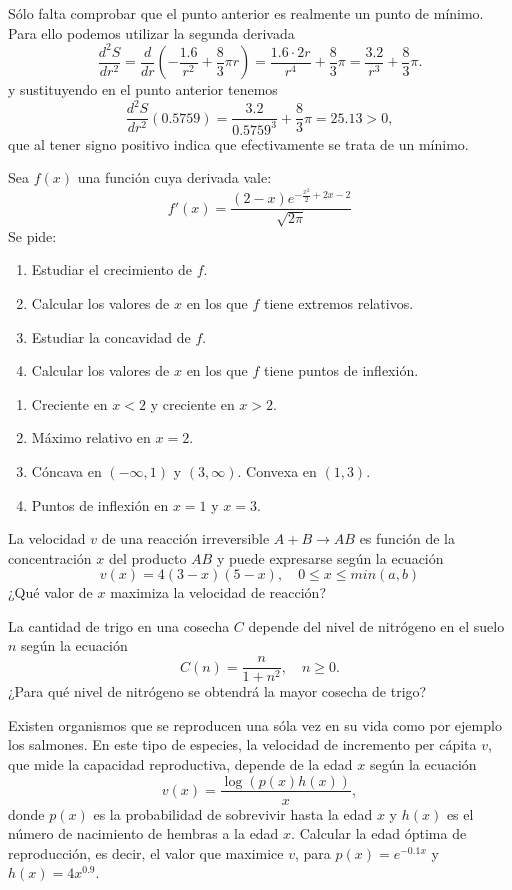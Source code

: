 {Sólo falta comprobar que el punto anterior es realmente un punto de mínimo. Para ello podemos utilizar la segunda derivada
\[
\frac{d^2S}{dr^2} = \frac{d}{dr}\left(-\frac{1.6}{r^2}+\frac{8}{3}\pi r\right) = \frac{1.6\cdot 2r}{r^4}+\frac{8}{3}\pi = \frac{3.2}{r^3}+\frac{8}{3}\pi. 
\]
y sustituyendo en el punto anterior tenemos
\[
\frac{d^2S}{dr^2}(0.5759) =  \frac{3.2}{0.5759^3}+\frac{8}{3}\pi = 25.13 >0,
\]
que al tener signo positivo indica que efectivamente se trata de un mínimo.
}

{Sea $f(x)$ una función cuya derivada vale:
\[
f'(x) = \frac{(2-x) e^{-\frac{x^2}{2}+2x-2}}{\sqrt{2\pi}}
\]
Se pide:
\begin{enumerate}
\item Estudiar el crecimiento de $f$.
\item Calcular los valores de $x$ en los que $f$ tiene extremos relativos.
\item Estudiar la concavidad de $f$.
\item Calcular los valores de $x$ en los que $f$ tiene puntos de inflexión.
\end{enumerate}
}
{\begin{enumerate}
\item Creciente en $x<2$ y creciente en $x>2$.
\item Máximo relativo en $x=2$.
\item Cóncava en $(-\infty,1)$ y $(3,\infty)$. Convexa en $(1,3)$.
\item Puntos de inflexión en $x=1$ y $x=3$.
\end{enumerate}
}
{
}


{La velocidad $v$ de una reacción irreversible $A+B\rightarrow AB$ es función de la concentración $x$ del producto $AB$ y puede expresarse según la ecuación
\[
v(x) = 4(3-x)(5-x),\quad 0\leq x\leq min(a,b)
\]
¿Qué valor de $x$ maximiza la velocidad de reacción?
}
{
}
{
}


{La cantidad de trigo en una cosecha $C$ depende del nivel de nitrógeno en el suelo $n$ según la ecuación
\[
C(n) = \frac{n}{1+n^2},\quad n\geq 0. 
\]
¿Para qué nivel de nitrógeno se obtendrá la mayor cosecha de trigo?
}
{
}
{
}


{Existen organismos que se reproducen una sóla vez en su vida como por ejemplo los salmones. 
En este tipo de especies, la velocidad de incremento per cápita $v$, que mide la capacidad reproductiva, depende de la edad $x$ según la ecuación
\[
v(x) = \frac{\log(p(x)h(x))}{x},
\] 
donde $p(x)$ es la probabilidad de sobrevivir hasta la edad $x$ y $h(x)$ es el número de nacimiento de hembras a la edad $x$. 
Calcular la edad óptima de reproducción, es decir, el valor que maximice $v$, para $p(x)=e^{-0.1x}$ y $h(x)=4x^{0.9}$.}
{
}
{
}


